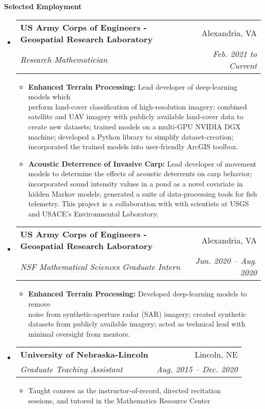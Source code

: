 \documentclass[letterpaper,11pt]{article}
\makeatletter
\newcommand{\resitem}[1]{\item #1 \vspace{-2pt}}
\newcommand{\resheading}[1]{{\large \colorbox{mygrey}{\begin{minipage}{\textwidth}{\textbf{#1 \vphantom{p\^{E}}}}\end{minipage}}}}
\newcommand{\ressubheading}[4]{
\begin{tabular*}{6.5in}{l@{\extracolsep{\fill}}r}
		\textbf{#1} & #2 \\
		\textit{#3} & \textit{#4} \\
\end{tabular*}\vspace{-6pt}}
\makeatother
\begin{document}
\resheading{Selected Employment}
	\begin{itemize}
		\item
		\ressubheading{US Army Corps of Engineers - Geospatial Research Laboratory}{Alexandria, VA}{Research Mathematician}{Feb. 2021 to Current}
		{\footnotesize
			\begin{itemize}
				\resitem{\textbf{Enhanced Terrain Processing:} Lead developer of deep-learning models which \\ perform land-cover classification of high-resolution imagery; combined satellite and UAV imagery with publicly available land-cover data to create new datasets; trained models on a multi-GPU NVIDIA DGX machine; developed a Python library to simplify dataset-creation; incorporated the trained models into user-friendly ArcGIS toolbox.}
				\resitem{\textbf{Acoustic Deterrence of Invasive Carp:} Lead developer of movement models to determine the effects of acoustic deterrents on carp behavior; incorporated sound intensity values in a pond as a novel covariate in hidden Markov models; generated a suite of data-processing tools for fish telemetry. This project is a collaboration with with scientists at USGS and USACE's Environmental Laboratory.}
			\end{itemize}
		}
	
	\newpage
	
		\item
		\ressubheading{US Army Corps of Engineers - Geospatial Research Laboratory}{Alexandria, VA}{NSF Mathematical Sciences Graduate Intern}{Jun. 2020 -- Aug. 2020}
		{\footnotesize
			\begin{itemize}
				\resitem{\textbf{Enhanced Terrain Processing:} Developed deep-learning models to remove \\ noise from synthetic-aperture radar (SAR) imagery; created synthetic datasets from publicly available imagery; acted as technical lead with minimal oversight from mentors.}
		\end{itemize}}

		\item
			{\ressubheading{University of Nebraska-Lincoln}{Lincoln, NE}{Graduate Teaching Assistant}{Aug. 2015 -- Dec. 2020}
				{ \footnotesize
				\begin{itemize}
					\resitem{Taught courses as the instructor-of-record, directed recitation \\ sessions, and tutored in the Mathematics Resource Center}
				\end{itemize}}}


\end{itemize}
\end{document}
